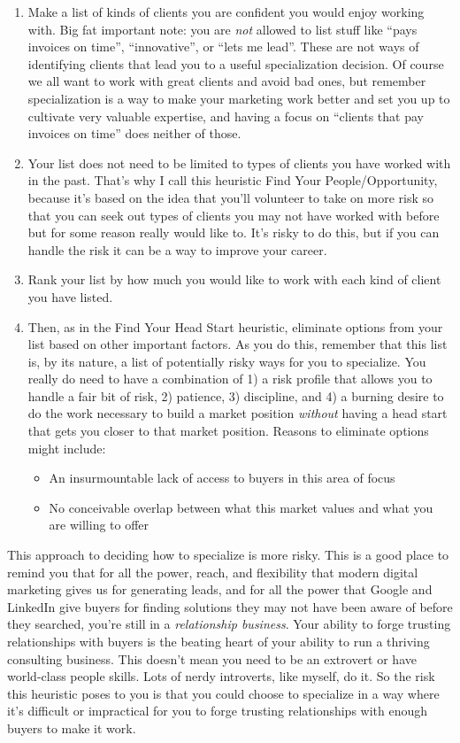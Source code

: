 \begin{enumerate}
\item Make a list of kinds of clients you are confident you would enjoy working with. Big fat important note: you are \emph{not} allowed to list stuff like ``pays invoices on time'', ``innovative'', or ``lets me lead''. These are not ways of identifying clients that lead you to a useful specialization decision. Of course we all want to work with great clients and avoid bad ones, but remember specialization is a way to make your marketing work better and set you up to cultivate very valuable expertise, and having a focus on ``clients that pay invoices on time'' does neither of those.
\item Your list does not need to be limited to types of clients you have worked with in the past. That's why I call this heuristic Find Your People/Opportunity, because it's based on the idea that you'll volunteer to take on more risk so that you can seek out types of clients you may not have worked with before but for some reason really would like to. It's risky to do this, but if you can handle the risk it can be a way to improve your career.
\item Rank your list by how much you would like to work with each kind of client you have listed.
\item Then, as in the Find Your Head Start heuristic, eliminate options from your list based on other important factors. As you do this, remember that this list is, by its nature, a list of potentially risky ways for you to specialize. You really do need to have a combination of 1) a risk profile that allows you to handle a fair bit of risk, 2) patience, 3) discipline, and 4) a burning desire to do the work necessary to build a market position \emph{without} having a head start that gets you closer to that market position. Reasons to eliminate options might include:


\begin{itemize}
\item An insurmountable lack of access to buyers in this area of focus
\item No conceivable overlap between what this market values and what you are willing to offer
\end{itemize}
\end{enumerate}

This approach to deciding how to specialize is more risky. This is a good place to remind you that for all the power, reach, and flexibility that modern digital marketing gives us for generating leads, and for all the power that Google and LinkedIn give buyers for finding solutions they may not have been aware of before they searched, you're still in a \emph{relationship business}. Your ability to forge trusting relationships with buyers is the beating heart of your ability to run a thriving consulting business. This doesn't mean you need to be an extrovert or have world-class people skills. Lots of nerdy introverts, like myself, do it. So the risk this heuristic poses to you is that you could choose to specialize in a way where it's difficult or impractical for you to forge trusting relationships with enough buyers to make it work.

